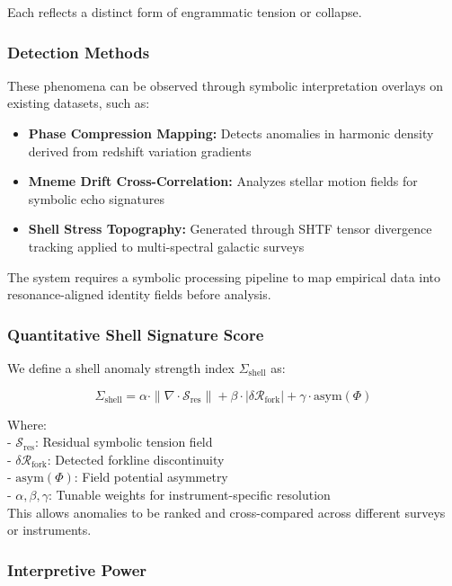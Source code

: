 \documentclass[12pt]{article}
\begin{document}
Each reflects a distinct form of engrammatic tension or collapse.

\subsubsection{Detection Methods}

These phenomena can be observed through symbolic interpretation overlays on existing datasets, such as:

\begin{itemize}[noitemsep]
  \item \textbf{Phase Compression Mapping:} Detects anomalies in harmonic density derived from redshift variation gradients
  \item \textbf{Mneme Drift Cross-Correlation:} Analyzes stellar motion fields for symbolic echo signatures
  \item \textbf{Shell Stress Topography:} Generated through SHTF tensor divergence tracking applied to multi-spectral galactic surveys
\end{itemize}

The system requires a symbolic processing pipeline to map empirical data into resonance-aligned identity fields before analysis.

\subsubsection{Quantitative Shell Signature Score}

We define a shell anomaly strength index \( \Sigma_{\text{shell}} \) as:

\[
\Sigma_{\text{shell}} = \alpha \cdot \|\nabla \cdot \mathcal{S}_{\text{res}}\| + \beta \cdot \left| \delta \mathcal{R}_{\text{fork}} \right| + \gamma \cdot \text{asym}(\Phi)
\]

Where:\\
- \( \mathcal{S}_{\text{res}} \): Residual symbolic tension field\\
- \( \delta \mathcal{R}_{\text{fork}} \): Detected forkline discontinuity\\
- \( \text{asym}(\Phi) \): Field potential asymmetry\\
- \( \alpha, \beta, \gamma \): Tunable weights for instrument-specific resolution\\

This allows anomalies to be ranked and cross-compared across different surveys or instruments.

\subsubsection{Interpretive Power}
\end{document}
